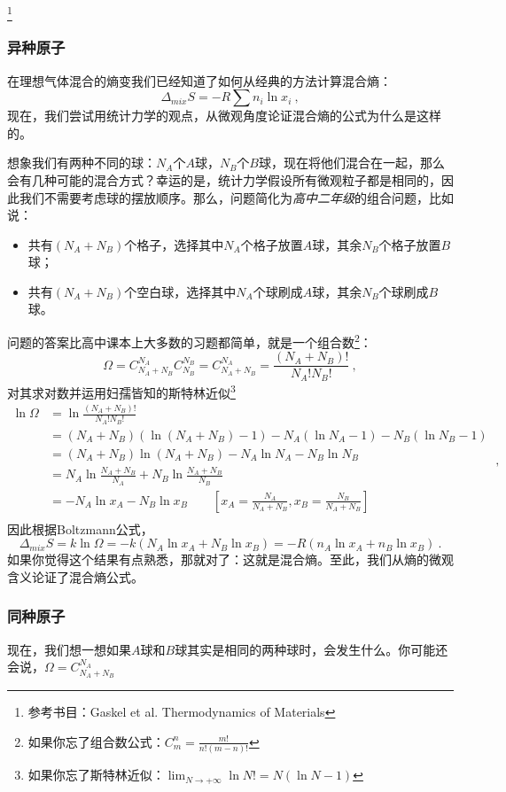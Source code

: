 


\footnote{参考书目：Gaskel et al. Thermodynamics of Materials}
\subsubsection{异种原子}
在理想气体混合的熵变我们已经知道了如何从经典的方法计算混合熵：
\begin{equation}
\Delta_{mix} S = - R \sum n_i \ln x_i~,
\end{equation}
现在，我们尝试用统计力学的观点，从微观角度论证混合熵的公式为什么是这样的。

想象我们有两种不同的球：$N_A$个$A$球，$N_B$个$B$球，现在将他们混合在一起，那么会有几种可能的混合方式？幸运的是，统计力学假设所有微观粒子都是相同的，因此我们不需要考虑球的摆放顺序。那么，问题简化为\textsl{高中二年级}的组合问题，比如说：
\begin{itemize}
\item 共有$(N_A+N_B)$个格子，选择其中$N_A$个格子放置$A$球，其余$N_B$个格子放置$B$球；
\item 共有$(N_A+N_B)$个空白球，选择其中$N_A$个球刷成$A$球，其余$N_B$个球刷成$B$球。
\end{itemize}
问题的答案比高中课本上大多数的习题都简单，就是一个组合数\footnote{如果你忘了组合数公式：$C^n_m = \frac{m!}{n!(m-n)!}$}：
\begin{equation}
\Omega = C^{N_A}_{N_A+N_B} C^{N_B}_{N_B} =  C^{N_A}_{N_A+N_B}  = \frac{(N_A+N_B)!}{N_A!N_B!}~,
\end{equation}
对其求对数并运用妇孺皆知的斯特林近似\footnote{如果你忘了斯特林近似：$\lim_{N \to +\infty} \ln N! = N (\ln N -1)$}
\begin{equation}
\begin{aligned}
\ln \Omega &= \ln \frac{(N_A+N_B)!}{N_A!N_B!} \\
 &= (N_A+N_B) (\ln (N_A+N_B) - 1) - N_A (\ln N_A - 1) - N_B (\ln N_B - 1) \\
 &= (N_A+N_B) \ln (N_A+N_B) - N_A \ln N_A - N_B \ln N_B \\
 &= N_A \ln \frac{N_A+N_B}{N_A} + N_B \ln \frac{N_A+N_B}{N_B} \\
 &= - N_A \ln x_A - N_B \ln x_B \qquad \left [x_A = \frac{N_A}{N_A+N_B}, x_B = \frac{N_B}{N_A+N_B} \right ]\\
\end{aligned}~,
\end{equation}
因此根据Boltzmann公式，
\begin{equation}
\Delta_{mix} S = k \ln \Omega = - k(N_A \ln x_A + N_B \ln x_B) = - R(n_A \ln x_A + n_B \ln x_B) ~.
\end{equation}
如果你觉得这个结果有点熟悉，那就对了：这就是混合熵。至此，我们从熵的微观含义论证了混合熵公式。

\subsubsection{同种原子}
现在，我们想一想如果$A$球和$B$球其实是相同的两种球时，会发生什么。你可能还会说，$\Omega = C^{N_A}_{N_A+N_B}$